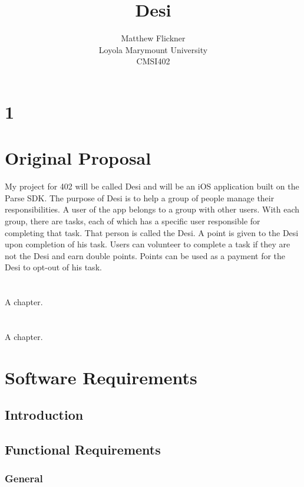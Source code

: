 \documentclass[11pt, a4paper]{report}
\title{Desi}
\author{Matthew Flickner \\ Loyola Marymount University\\ CMSI402}
\providecommand\phantomsection{}
\begin{document}
\clearpage
\phantomsection
{}
\maketitle


\tableofcontents
\newpage
 
\chapter{1}

\chapter{Original Proposal}
My project for 402 will be called Desi and will be an iOS application built on the Parse SDK. The purpose of Desi is to help a group of people manage their responsibilities. A user of the app belongs to a group with other users. With each group, there are tasks, each of which has a specific user responsible for completing that task. That person is called the Desi. A point is given to the Desi upon completion of his task. Users can volunteer to complete a task if they are not the Desi and earn double points. Points can be used as a payment for the Desi to opt-out of his task.

\chapter{}
 A chapter.

\chapter{}
 A chapter.

\chapter{Software Requirements}

\section{Introduction}

\section{Functional Requirements}

\subsection{General}
\end{document}
